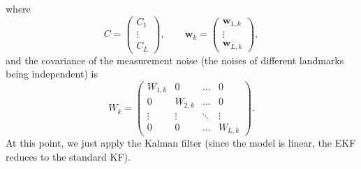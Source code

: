 \documentclass[10pt, a4paper]{report}
\begin{document}
where\begin{equation}
    C=\begin{pmatrix}
        C_1\\ \vdots \\ C_L
    \end{pmatrix},\qquad 
    \mathbf w_k=\begin{pmatrix}
         \mathbf w_{1,k}\\ \vdots \\ \mathbf w_{L,k}
    \end{pmatrix},
\end{equation}
and the covariance of the measurement noise (the noises of different landmarks being independent) is\begin{equation}
    W_k=\begin{pmatrix}
{W}_{1,k} & 0 & \dots & 0 \\
0 & {W}_{2,k} & \dots & 0 \\
\vdots & \vdots & \ddots & \vdots \\
0 & 0 & \dots & {W}_{L,k}
\end{pmatrix}.
\end{equation}
At this point, we just apply the Kalman filter (since the model is linear, the EKF reduces to the standard KF).


\end{document}
